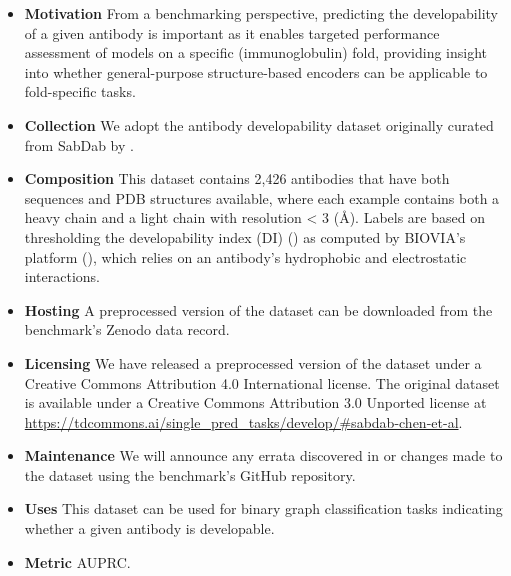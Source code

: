 \begin{itemize}
    \item \textbf{Motivation} From a benchmarking perspective, predicting the developability of a given antibody is important as it enables targeted performance assessment of models on a specific (immunoglobulin) fold, providing insight into whether general-purpose structure-based encoders can be applicable to fold-specific tasks.
    \item \textbf{Collection} We adopt the antibody developability dataset originally curated from SabDab \citep{dunbar2014sabdab} by \citet{Chen2020}.
    \item \textbf{Composition} This dataset contains 2,426 antibodies that have both sequences and PDB structures available, where each example contains both a heavy chain and a light chain with resolution < 3 (\AA). Labels are based on thresholding the developability index (DI) (\citep{Lauer2012}) as computed by BIOVIA's platform (\citep{Accelrys2018BioviaDiscoveryStudio}), which relies on an antibody's hydrophobic and electrostatic interactions.
    \item \textbf{Hosting} A preprocessed version of the dataset can be downloaded from the benchmark's Zenodo data record.%
    \item \textbf{Licensing} We have released a preprocessed version of the dataset under a Creative Commons Attribution 4.0 International license. The original dataset is available under a Creative Commons Attribution 3.0 Unported license at \url{https://tdcommons.ai/single_pred_tasks/develop/#sabdab-chen-et-al}.
    \item \textbf{Maintenance} We will announce any errata discovered in or changes made to the dataset using the benchmark's GitHub repository.%
    \item \textbf{Uses} This dataset can be used for binary graph classification tasks indicating whether a given antibody is developable.
    \item \textbf{Metric} AUPRC.
\end{itemize}

